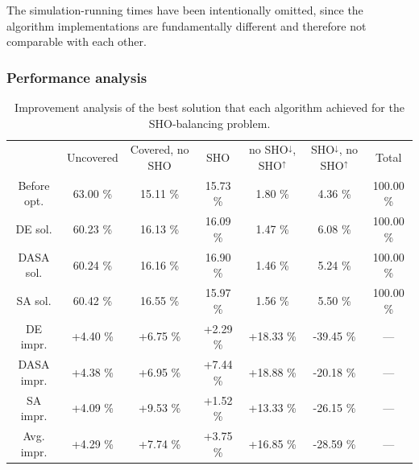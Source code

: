 The simulation-running times have been intentionally omitted, since
the algorithm implementations are fundamentally different and therefore
not comparable with each other.


\subsubsection{Performance analysis}

\begin{table}
\centering

\caption{Improvement analysis of the best solution that each algorithm achieved
for the SHO-balancing problem.\textit{\label{tab:07-Optimization_result_analysis}}}


{\scriptsize{}}%
\begin{tabular}{ccccccc}
\toprule 
 & {\scriptsize{Uncovered}} & {\scriptsize{Covered, no SHO}} & {\scriptsize{SHO}} & {\scriptsize{no SHO$^{\downarrow}$, SHO$^{\uparrow}$}} & {\scriptsize{SHO$^{\downarrow}$, no SHO$^{\uparrow}$}} & {\scriptsize{Total}}\tabularnewline\addlinespace
\midrule
{\scriptsize{Before opt.}} & {\scriptsize{63.00 \%}} & {\scriptsize{15.11 \%}} & {\scriptsize{15.73 \%}} & {\scriptsize{1.80 \%}} & {\scriptsize{4.36 \%}} & {\scriptsize{100.00 \%}}\tabularnewline
\cmidrule{2-7} 
{\scriptsize{DE sol.}} & {\scriptsize{60.23 \%}} & {\scriptsize{16.13 \%}} & {\scriptsize{16.09 \%}} & {\scriptsize{1.47 \%}} & {\scriptsize{6.08 \%}} & {\scriptsize{100.00 \%}}\tabularnewline
{\scriptsize{DASA sol.}} & {\scriptsize{60.24 \%}} & {\scriptsize{16.16 \%}} & {\scriptsize{16.90 \%}} & {\scriptsize{1.46 \%}} & {\scriptsize{5.24 \%}} & {\scriptsize{100.00 \%}}\tabularnewline
{\scriptsize{SA sol.}} & {\scriptsize{60.42 \%}} & {\scriptsize{16.55 \%}} & {\scriptsize{15.97 \%}} & {\scriptsize{1.56 \%}} & {\scriptsize{5.50 \%}} & {\scriptsize{100.00 \%}}\tabularnewline
\cmidrule{2-7} 
{\scriptsize{DE impr.}} & {\scriptsize{+4.40 \%}} & {\scriptsize{+6.75 \%}} & {\scriptsize{+2.29 \%}} & {\scriptsize{+18.33 \%}} & {\scriptsize{-39.45 \%}} & {\scriptsize{---}}\tabularnewline
{\scriptsize{DASA impr.}} & {\scriptsize{+4.38 \%}} & {\scriptsize{+6.95 \%}} & {\scriptsize{+7.44 \%}} & {\scriptsize{+18.88 \%}} & {\scriptsize{-20.18 \%}} & {\scriptsize{---}}\tabularnewline
{\scriptsize{SA impr.}} & {\scriptsize{+4.09 \%}} & {\scriptsize{+9.53 \%}} & {\scriptsize{+1.52 \%}} & {\scriptsize{+13.33 \%}} & {\scriptsize{-26.15 \%}} & {\scriptsize{---}}\tabularnewline
\cmidrule{2-7} 
{\scriptsize{Avg. impr.}} & {\scriptsize{+4.29 \%}} & {\scriptsize{+7.74 \%}} & {\scriptsize{+3.75 \%}} & {\scriptsize{+16.85 \%}} & {\scriptsize{-28.59 \%}} & {\scriptsize{---}}\tabularnewline
\bottomrule
\end{tabular}
\end{table}


